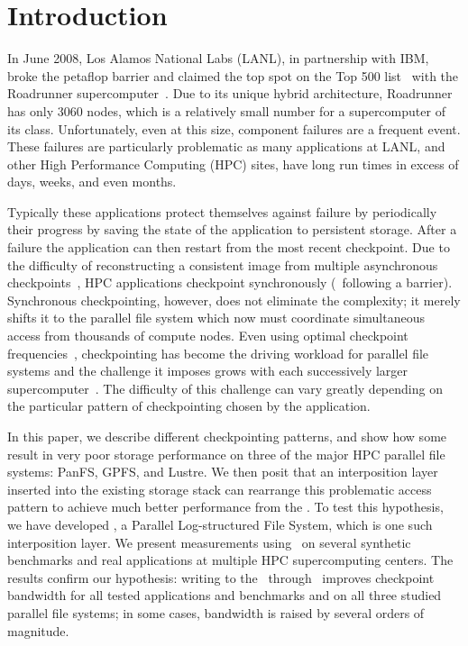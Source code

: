 \section{Introduction}

In June 2008, Los Alamos National Labs (LANL), in partnership with IBM, broke
the petaflop barrier and claimed the top spot on the Top 500 list~\cite{top500}
with the Roadrunner supercomputer~\cite{roadrunner}.  Due to its unique hybrid
architecture, Roadrunner has only 3060 nodes, which is a relatively small
number for a supercomputer of its class.  Unfortunately, even at this size,
component failures are a frequent event.  These failures are particularly
problematic as many applications at LANL, and other High Performance Computing
(HPC) sites, have long run times in excess of days, weeks, and even months.

Typically these applications protect themselves against failure by periodically
 their progress by saving the state of the application to
persistent storage. After a failure the application can then restart from the most recent 
checkpoint.  Due to the difficulty of reconstructing a consistent
image from multiple asynchronous checkpoints~\cite{lamport1978}, HPC
applications checkpoint synchronously (\ie\ following a barrier).  Synchronous
checkpointing, however, does not eliminate the complexity; it merely shifts it to
the parallel file system which now must coordinate simultaneous access from
thousands of compute nodes.  Even using optimal checkpoint frequencies~\cite{daly-optimal}, 
checkpointing has become the driving workload for
parallel file systems and the challenge it imposes grows with each successively
larger supercomputer~\cite{pcl:99:me,schroeder2007}.  The difficulty of this
challenge can vary greatly depending on the particular pattern of checkpointing
chosen by the application. 

In this paper, we describe different checkpointing patterns, and show how some
result in very poor storage performance on three of the major HPC
parallel file systems: PanFS, GPFS, and Lustre.  We then posit that an
interposition layer inserted into the existing storage stack can rearrange this
problematic access pattern to achieve much better performance from the
\upfs.  To test this hypothesis, we have developed \plfs, a Parallel
Log-structured File System, which is one such interposition layer.  We present measurements using \plfs\ on several synthetic benchmarks and real applications at multiple HPC supercomputing centers.  The
results confirm our hypothesis: writing to the \upfs\ through
\plfs\ improves checkpoint bandwidth for all tested applications and
benchmarks and on all three studied parallel file systems; in some cases,
bandwidth is raised by several orders of magnitude.

